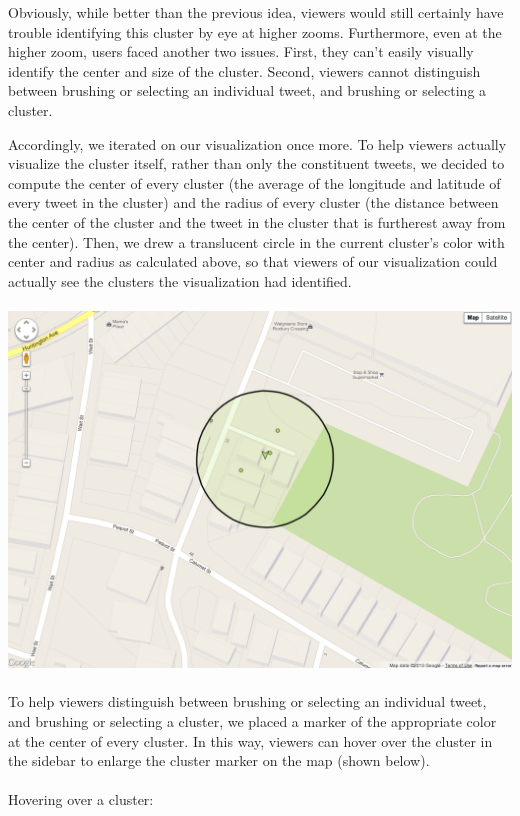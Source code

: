 \documentclass[pdftex,12pt,a4paper]{article}
\begin{document}
Obviously, while better than the previous idea, viewers would still certainly have trouble identifying this cluster by eye at higher zooms. Furthermore, even at the higher zoom, users faced another two issues. First, they can't easily visually identify the center and size of the cluster. Second, viewers cannot distinguish between brushing or selecting an individual tweet, and brushing or selecting a cluster.

Accordingly, we iterated on our visualization once more. To help viewers actually visualize the cluster itself, rather than only the constituent tweets, we decided to compute the center of every cluster (the average of the longitude and latitude of every tweet in the cluster) and the radius of every cluster (the distance between the center of the cluster and the tweet in the cluster that is furtherest away from the center). Then, we drew a translucent circle in the current cluster's color with center and radius as calculated above, so that viewers of our visualization could actually see the clusters the visualization had identified. \\ \\
\includegraphics[width=5.5in]{success1.png} \\ \\
To help viewers distinguish between brushing or selecting an individual tweet, and brushing or selecting a cluster, we placed a marker of the appropriate color at the center of every cluster. In this way, viewers can hover over the cluster in the sidebar to enlarge the cluster marker on the map (shown below). \\ \\
Hovering over a cluster: \\
\end{document}
